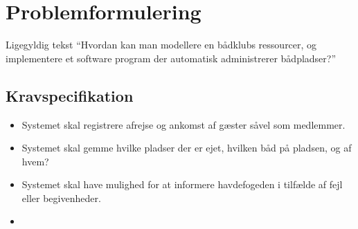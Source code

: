 \chapter{Problemformulering}
\label{cha:problemformulering}

Ligegyldig tekst
\enquote{Hvordan kan man modellere en bådklubs ressourcer, og implementere et software program der automatisk administrerer bådpladser?}


\section{Kravspecifikation} %
\label{sec:Kravspecifikation}

\begin{itemize}
  \item Systemet skal registrere afrejse og ankomst af gæster såvel som medlemmer.
  \item Systemet skal gemme hvilke pladser der er ejet, hvilken båd på pladsen, og af hvem?
  \item Systemet skal have mulighed for at informere havdefogeden i tilfælde af fejl eller begivenheder.
  \item 
\end{itemize}


